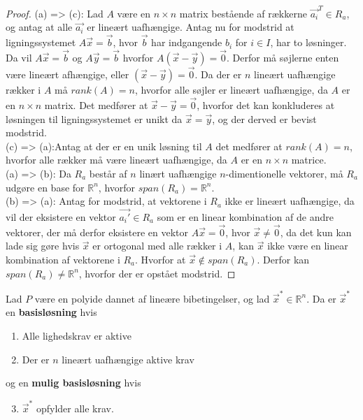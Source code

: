 \begin{proof}
(a) => (c): Lad $A$ være en $n \times n$ matrix bestående af rækkerne $\vec{a_i}^T \in R_a$, og antag at alle $\vec{a_i}$ er lineært uafhængige. 
Antag nu for modstrid at ligningssystemet $A\vec{x} = \vec{b}$, hvor $\vec{b}$ har indgangende $b_i$ for $i \in I$, har to løsninger. 
Da vil $A \vec{x} = \vec{b}$ og $A \vec{y} = \vec{b}$ hvorfor $A(\vec{x}-\vec{y}) = \vec{0}$.
Derfor må søjlerne enten være lineært afhængige, eller $(\vec{x}-\vec{y})= \vec{0}$.
Da der er $n$ lineært uafhængige rækker i $A$ må $rank(A) = n$, hvorfor alle søjler er lineært uafhængige, da $A$ er en $n \times n$ matrix.
Det medfører at $\vec{x}-\vec{y} = \vec{0}$, hvorfor det kan konkluderes at løsningen til ligningssystemet er unikt da $ \vec{x}=\vec{y}$, og der derved er bevist modstrid.
\\(c) => (a):Antag at der er en unik løsning til $A$ det medfører at $rank(A) = n$, hvorfor alle rækker må være lineært uafhængige, da $A$ er en $n \times n$ matrice. %
\\ (a) => (b): Da $R_a$ består af $n$ linært uafhængige $n$-dimentionelle vektorer, må $R_a$ udgøre en base for $\mathds{R}^n$, hvorfor $span(R_a) = \mathds{R}^n$.
\\ (b) => (a): Antag for modstrid, at vektorene i $R_a$ ikke er lineært uafhængige, da vil der eksistere en vektor $\vec{a_i'} \in R_a$ som er en linear kombination af de andre vektorer, der må derfor eksistere en vektor $A\vec{x} = \vec{0}$, hvor $\vec{x} \neq \vec{0}$, da det kun kan lade sig gøre hvis $\vec{x}$ er ortogonal med alle rækker i $A$, kan $\vec{x}$ ikke være en linear kombination af vektorene i $R_a$.
Hvorfor at $\vec{x} \notin span(R_a)$.
Derfor kan $span(R_a) \neq \mathds{R}^n$, hvorfor der er opstået modstrid.
\end{proof}

\begin{defn}[Basisløsning]
Lad $P$ være en polyide dannet af lineære bibetingelser, og lad $\vec{x}^*\in \mathds{R}^n$. Da er $\vec{x}^*$ en \textbf{basisløsning} hvis
\begin{enumerate}[label=(\alph*)]
\item Alle lighedskrav er aktive
\item Der er $n$ lineært uafhængige aktive krav
\end{enumerate}
og en \textbf{mulig basisløsning} hvis
\begin{enumerate}[label=(\alph*)]
\setcounter{enumi}{2}
\item $\vec{x}^*$ opfylder alle krav.
\end{enumerate}
\label{def:basislosning}
\end{defn}

